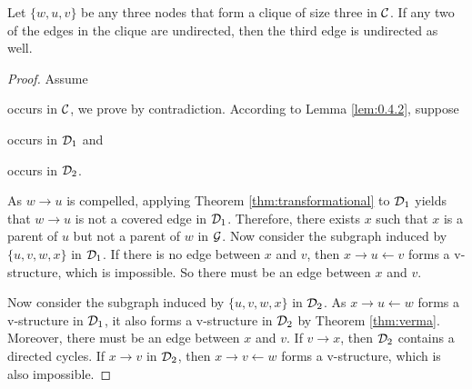 \begin{lemma}\label{lem:0.4.3}
    Let $\{w, u, v\}$ be any three nodes that form a clique of size three in $\mathcal{C}$. If any two of the edges in the clique are undirected, then the third edge is undirected as well.
\end{lemma}
\begin{proof}
    Assume  occurs in $\mathcal{C}$, we prove by contradiction. 
      According to Lemma \ref*{lem:0.4.2}, suppose  occurs in $\mathcal{D}_1$ and 
       occurs in $\mathcal{D}_2$. \par
      As $w\rightarrow u$ is compelled, applying Theorem \ref{thm:transformational} to $\mathcal{D}_1$ yields that $w\to u$ is not a covered edge in $\mathcal{D}_1$.
      Therefore, there exists $x$ such that $x$ is a parent of $u$ but not a parent of $w$ in $\mathcal{G}$. Now consider the subgraph induced by $\{u,v,w,x\}$ in $\mathcal{D}_1$.
      If there is no edge between $x$ and $v$, then $x\rightarrow u \leftarrow v$ forms a v-structure, which is impossible. So there must be an edge between $x$ and $v$.\par 
      Now consider the subgraph induced by $\{u,v,w,x\}$ in $\mathcal{D}_2$. As $x\rightarrow u \leftarrow w$ forms a v-structure in $\mathcal{D}_1$, it also forms a v-structure in $\mathcal{D}_2$ by Theorem \ref{thm:verma}. 
      Moreover, there must be an edge between $x$ and $v$. If $v\to x$, then $\mathcal{D}_2$ contains a directed cycles. If $x\rightarrow v$ in $\mathcal{D}_2$, then $x\rightarrow v \leftarrow w$ forms a v-structure, which is also impossible.

\end{proof}

